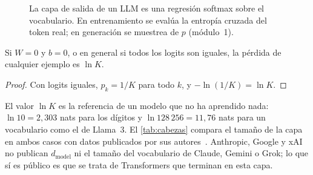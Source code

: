 \begin{figure}[h]
\centering
{}
\caption{La capa de salida de un LLM es una regresión softmax sobre el vocabulario. En entrenamiento se evalúa la entropía cruzada del token real; en generación se muestrea de $p$ (módulo~1).}
\label{fig:cabeza}
\end{figure}

\begin{proposicion}\label{prop:inicial}
Si $W=0$ y $b=0$, o en general si todos los logits son iguales, la pérdida de cualquier ejemplo es $\ln K$.
\end{proposicion}

\begin{proof}
Con logits iguales, $p_k=1/K$ para todo $k$, y $-\ln(1/K)=\ln K$.
\end{proof}

El valor $\ln K$ es la referencia de un modelo que no ha aprendido nada: $\ln 10=2{,}303$ nats para los dígitos y $\ln 128\,256=11{,}76$ nats para un vocabulario como el de Llama~3. El \cref{tab:cabezas} compara el tamaño de la capa en ambos casos con datos publicados por sus autores~\cite{llama2,llama3}. Anthropic, Google y xAI no publican $d_{\text{model}}$ ni el tamaño del vocabulario de Claude, Gemini o Grok; lo que sí es público es que se trata de Transformers que terminan en esta capa.

